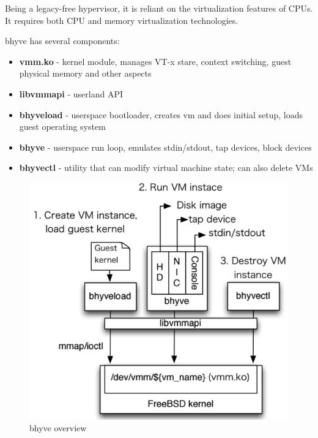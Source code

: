 Being a legacy-free hypervisor, it is reliant on the virtualization features of CPUs. It requires both CPU and memory virtualization technologies.

bhyve has several components:
\begin{itemize}
\item
\textbf{vmm.ko} - kernel module, manages VT-x stare, context switching, guest physical memory and other aspects
\item
\textbf{libvmmapi} - userland API
\item
\textbf{bhyveload} - userspace bootloader, creates vm and does initial setup, loads guest operating system
\item
\textbf{bhyve} - userspace run loop, emulates stdin/stdout, tap devices, block devices
\item
\textbf{bhyvectl} - utility that can modify virtual machine state; can also delete VMs
\end{itemize}

\begin{figure}[h]
\centering
  \includegraphics[width=.6\linewidth]{img/bhyve.png}
  \caption{bhyve overview}
\end{figure}
